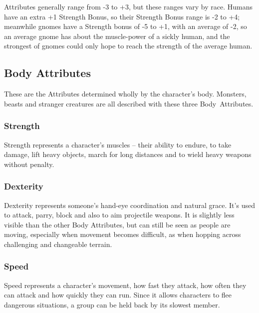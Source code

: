 \begin{multicols}{2}

\noindent
Attributes generally range from -3 to +3, but these ranges vary by race.
Humans have an extra +1 Strength Bonus, so their Strength Bonus range is -2 to +4; meanwhile gnomes have a Strength bonus of -5 to +1, with an average of -2, so an average gnome has about the muscle-power of a sickly human, and the strongest of gnomes could only hope to reach the strength of the average human.

\subsection{Body Attributes}

These are the Attributes determined wholly by the character's body.
Monsters, beasts and stranger creatures are all described with these three Body~Attributes.


\subsubsection[Strength]{Strength }

Strength represents a character's muscles -- their ability to endure, to take damage, lift heavy objects, march for long distances and to wield heavy weapons without penalty.

\subsubsection[Dexterity]{Dexterity }

Dexterity represents someone's hand-eye coordination and natural grace.
It's used to attack, parry, block and also to aim projectile weapons.
It is slightly less visible than the other Body Attributes, but can still be seen as people are moving, especially when movement becomes difficult, as when hopping across challenging and changeable terrain.

\subsubsection[Speed]{Speed }

Speed represents a character's movement, how fast they attack, how often they can attack and how quickly they can run.
Since it allows characters to flee dangerous situations, a group can be held back by its slowest member.


\end{multicols}
